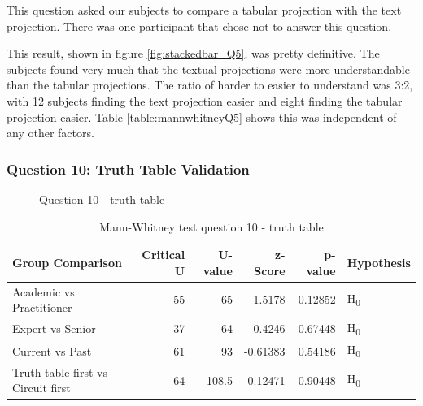 This question asked our subjects to compare a tabular projection with the text projection.
There was one participant that chose not to answer this question.

This result, shown in figure \ref{fig:stackedbar_Q5}, was pretty definitive.
The subjects found very much that the textual projections were more understandable than the tabular projections.
The ratio of harder to easier to understand was 3:2, with 12 subjects finding the text projection easier and eight finding the tabular projection easier.
Table \ref{table:mannwhitneyQ5} shows this was independent of any other factors.

\subsubsection{Question 10: Truth Table Validation}

\begin{figure}[H]
    \centering
    \caption{Question 10 - truth table}
    \label{fig:stackedbar_Q6}
\end{figure}

\begin{table}[H]
    \begin{center}
        \begin{tabular}{ |l ||r |r |r | r|l | } 
            \hline
            Group Comparison                   & Critical U & U-value & z-Score  & p-value & Hypothesis         \\
            \hline
            \hline
            Academic vs Practitioner           &  55        & 65      & 1.5178   & 0.12852 & H\textsubscript{0} \\ 
            \hline
            Expert vs Senior                   &  37        & 64      & -0.4246  & 0.67448 & H\textsubscript{0} \\ 
            \hline
            Current vs Past                    &  61        & 93      & -0.61383 & 0.54186 & H\textsubscript{0} \\ 
            \hline
            Truth table first vs Circuit first &  64        & 108.5   & -0.12471 & 0.90448 & H\textsubscript{0} \\ 
            \hline
        \end{tabular}
    \end{center}
    \caption{Mann-Whitney test question 10 - truth table}
    \label{table:mannwhitneyQ6}
\end{table}


